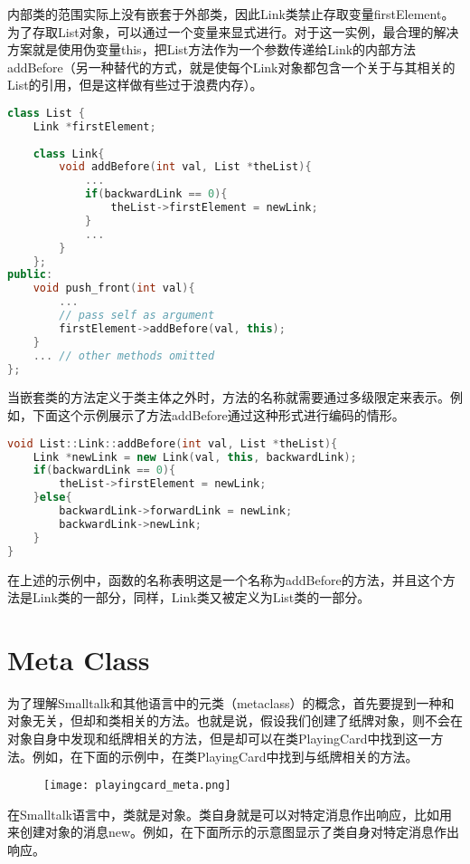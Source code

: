 内部类的范围实际上没有嵌套于外部类，因此Link类禁止存取变量firstElement。为了存取List对象，可以通过一个变量来显式进行。对于这一实例，最合理的解决方案就是使用伪变量this，把List方法作为一个参数传递给Link的内部方法addBefore（另一种替代的方式，就是使每个Link对象都包含一个关于与其相关的List的引用，但是这样做有些过于浪费内存）。



\begin{lstlisting}[language=C++]
class List {
	Link *firstElement;
	
	class Link{
		void addBefore(int val, List *theList){
			...
			if(backwardLink == 0){
				theList->firstElement = newLink;
			}
			...
		}
	};
public:
	void push_front(int val){
		...
		// pass self as argument
		firstElement->addBefore(val, this);
	}
	... // other methods omitted
};
\end{lstlisting}

当嵌套类的方法定义于类主体之外时，方法的名称就需要通过多级限定来表示。例如，下面这个示例展示了方法addBefore通过这种形式进行编码的情形。



\begin{lstlisting}[language=C++]
void List::Link::addBefore(int val, List *theList){
	Link *newLink = new Link(val, this, backwardLink);
	if(backwardLink == 0){
		theList->firstElement = newLink;
	}else{
		backwardLink->forwardLink = newLink;
		backwardLink->newLink;
	}
}
\end{lstlisting}

在上述的示例中，函数的名称表明这是一个名称为addBefore的方法，并且这个方法是Link类的一部分，同样，Link类又被定义为List类的一部分。

\section{Meta Class}


为了理解Smalltalk和其他语言中的元类（metaclass）的概念，首先要提到一种和对象无关，但却和类相关的方法。也就是说，假设我们创建了纸牌对象，则不会在对象自身中发现和纸牌相关的方法，但是却可以在类PlayingCard中找到这一方法。例如，在下面的示例中，在类PlayingCard中找到与纸牌相关的方法。

\begin{figure}[htbp]
\centering
\texttt{[image: playingcard\_meta.png]}
\label{fig:playingcard_meta}
\end{figure}


在Smalltalk语言中，类就是对象。类自身就是可以对特定消息作出响应，比如用来创建对象的消息new。例如，在下面所示的示意图显示了类自身对特定消息作出响应。


